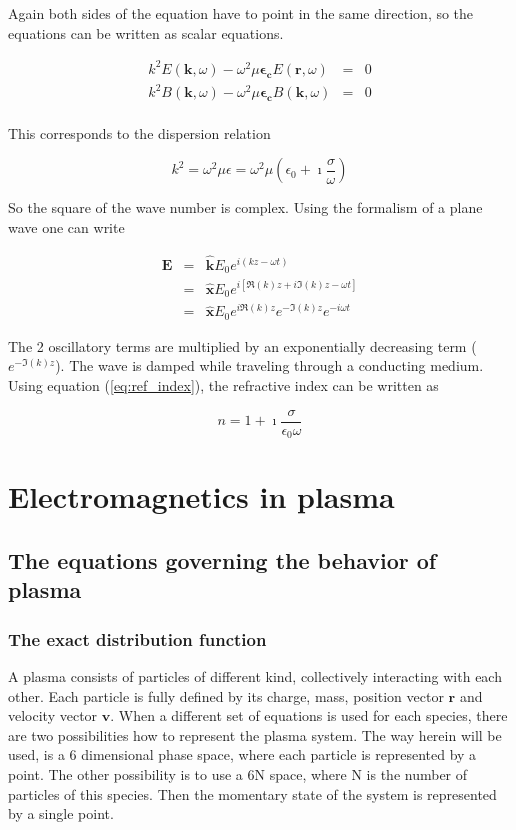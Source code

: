 \documentclass[a4paper,11pt]{thesis}
\begin{document}
Again both sides of the equation have to point in the same direction, so the equations can be written as scalar equations.

\begin{eqnarray}
k^2 E(\mathbf{k},\omega)- \omega^2  \mu \mathbf{\epsilon_c} E(\mathbf{r},\omega)&=&0 \\
k^2 B(\mathbf{k},\omega)- \omega^2  \mu \mathbf{\epsilon_c} B(\mathbf{k},\omega)&=&0
\end{eqnarray}\\

This corresponds to the dispersion relation

\begin{equation}
    k^2 = \omega^2  \mu \epsilon= \omega^2 \mu \left( \epsilon_0+\imath\frac{\sigma}{\omega} \right)
\end{equation}

So the square of the wave number is complex. Using the formalism of a plane wave one can write

\begin{eqnarray}\label{plane_wave_conductor}
    \mathbf{E}&=& \mathbf{\hat{k}}E_0 e^{i(kz-\omega t)} \nonumber\\
&=& \mathbf{\hat{x}}E_0 e^{i\left[ \Re(k)z+i\Im(k)z-\omega t\right] } \nonumber \\
&=& \mathbf{\hat{x}}E_0 e^{i\Re(k)z}e^{-\Im(k)z}e^{-i\omega t}
\end{eqnarray}

The 2 oscillatory terms are multiplied by an exponentially decreasing term ($e^{-\Im(k)z}$). The wave is damped while traveling
through a conducting medium. Using equation (\ref{eq:ref_index}), the refractive index can be written as

\begin{equation}
    n=1+\imath\frac{\sigma}{\epsilon_0 \omega}
\end{equation}



\section{Electromagnetics in plasma}
\subsection{The equations governing the behavior of plasma}
\subsubsection{The exact distribution function}
A plasma consists of particles of different kind, collectively interacting with each other. Each particle
is fully defined by its charge, mass, position vector $\mathbf{r}$ and velocity vector $\mathbf{v}$.
When a different set of equations is used for each species, there are two possibilities how to represent
the plasma system. The way herein will be used, is a 6 dimensional phase space, where each particle is represented by a point. The other possibility is to use a 6N space, where N is the number of particles of this species. Then the momentary state of the system is represented by a single point. \\
\end{document}
